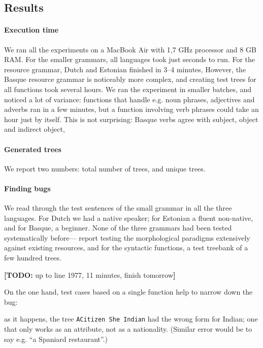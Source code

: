 \documentclass[11pt]{article}
\def\t#1{\texttt{#1}}
\newcommand{\todo}[1]{{\color{cyan}\textbf{[TODO: }#1\textbf{]}}}
\begin{document}
\subsection{Results}

\paragraph{Execution time} We ran all the experiments on a MacBook Air with 1,7 GHz processor and 8 GB RAM.
For the smaller grammars, all languages took just
seconds to run. For the resource grammar, Dutch and Estonian finished in
3--4 minutes,
However, the Basque resource grammar is noticeably more complex, and
creating test trees for all functions took several hours. We ran the
experiment in smaller batches, and noticed a lot of variance:
functions that handle e.g. noun phrases, adjectives and adverbs ran in
a few minutes, but a function involving verb phrases could take an
hour just by itself. This is not surprising: Basque verbs agree with
subject, object and indirect object, 

\paragraph{Generated trees} 

We report two numbers: total number of trees, and unique trees. 


\paragraph{Finding bugs} 
We read through the test sentences of the small grammar in all the
three languages. 
For Dutch we had a native speaker; for Estonian a fluent non-native,
and for Basque, a beginner. None of the three grammars had been tested
systematically before---\cite{listenmaa_kaljurand2014} report testing
the morphological paradigms extensively against existing resources,
and for the syntactic functions, a test treebank of a few hundred trees.

\todo{up to line 1977, 11 minutes, finish tomorrow}

On the one hand, test cases based on a single function help to narrow
down the bug: 

as it happens, the tree \t{ACitizen She Indian} had the
wrong form for Indian; one that only works as an attribute, not as a
nationality. (Similar error would be to say e.g. ``a Spaniard
restaurant''.)
\end{document}
